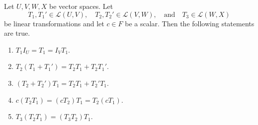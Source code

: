 \begin{lemma}
  \label{lem:composition}
  Let $U, V, W, X$ be vector spaces.
  Let
  \begin{equation*}
    T_1, T_1' \in \mathcal{L}(U, V),
    \quad
    T_2, T_2' \in \mathcal{L}(V, W),
    \quad \text{and} \quad
    T_3 \in \mathcal{L}(W, X)
  \end{equation*}
  be linear transformations and let $c \in F$ be a scalar.
  Then the following statements are true.
  \begin{enumerate}
    \item $T_1I_U = T_1 = I_VT_1$.
    \item $T_2(T_1 + T_1') = T_2T_1 + T_2T_1'$.
    \item $(T_2 + T_2')T_1 = T_2T_1 + T_2'T_1$.
    \item $c(T_2T_1) = (cT_2)T_1 = T_2(cT_1)$.
    \item $T_3(T_2T_1) = (T_3T_2)T_1$.
  \end{enumerate}
\end{lemma}
